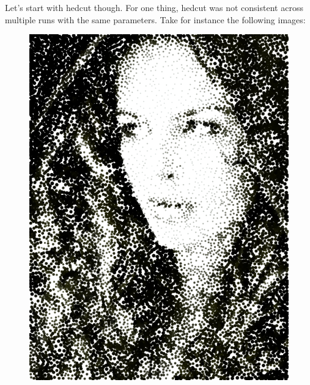 \documentclass[11pt]{article}
\begin{document}
Let's start with hedcut though. For one thing, hedcut was not consistent across multiple runs with the same parameters. Take for instance the following images:

\begin{figure}[H]
\includegraphics[scale=0.4]{fairyeyes-10000-r4-1.png}

\end{figure}
\end{document}

